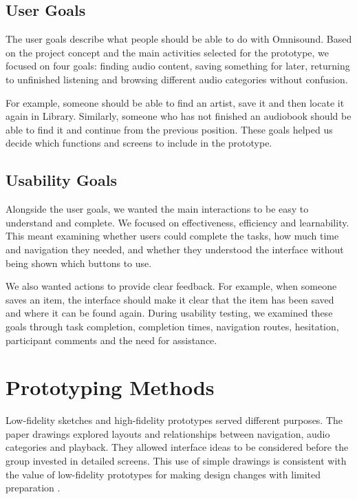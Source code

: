 \subsection{User Goals}

The user goals describe what people should be able to do with Omnisound. Based on the project concept and the main activities selected for the prototype, we focused on four goals: finding audio content, saving something for later, returning to unfinished listening and browsing different audio categories without confusion.

For example, someone should be able to find an artist, save it and then locate it again in Library. Similarly, someone who has not finished an audiobook should be able to find it and continue from the previous position. These goals helped us decide which functions and screens to include in the prototype.

\subsection{Usability Goals}

Alongside the user goals, we wanted the main interactions to be easy to understand and complete. We focused on effectiveness, efficiency and learnability. This meant examining whether users could complete the tasks, how much time and navigation they needed, and whether they understood the interface without being shown which buttons to use.

We also wanted actions to provide clear feedback. For example, when someone saves an item, the interface should make it clear that the item has been saved and where it can be found again. During usability testing, we examined these goals through task completion, completion times, navigation routes, hesitation, participant comments and the need for assistance.

\section{Prototyping Methods}
\label{sec:method-prototyping}

Low-fidelity sketches and high-fidelity prototypes served different purposes.
The paper drawings explored layouts and relationships between navigation,
audio categories and playback. They allowed interface ideas to be considered
before the group invested in detailed screens. This use of simple drawings
is consistent with the value of low-fidelity prototypes for making design
changes with limited preparation \cite[Sec.~``Benefits of Low-Fidelity
Prototypes'']{perniceprototypes}.

